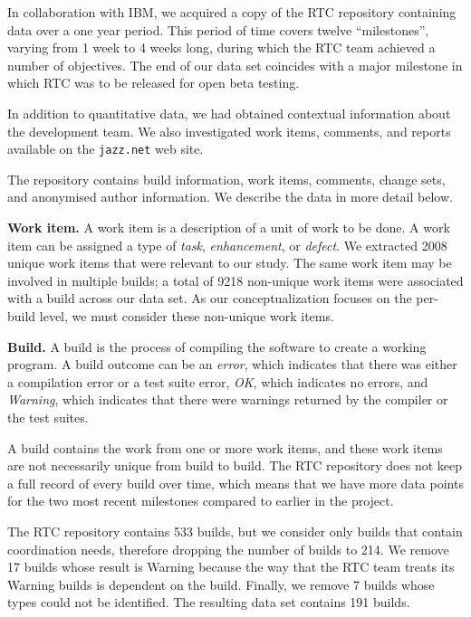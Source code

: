 \documentclass[12pt,oneside]{book}
\begin{document}
In collaboration with IBM, we acquired a copy of the RTC repository containing data over a one year period.
This period of time covers twelve ``milestones'', varying from 1 week to 4 weeks long, during which the RTC team achieved a number of objectives. The end of our data set coincides with a major milestone in which RTC was to be released for open beta testing. 

In addition to quantitative data, we had obtained contextual information about the development team. We also investigated work items, comments, and reports available on the \texttt{jazz.net} web site.

The repository contains build information, work items, comments, change sets, and anonymised author information. We describe the data in more detail below.

\textbf{Work item.} A work item is a description of a unit of work to be done. A work item can be assigned a type of \emph{task}, \emph{enhancement}, or \emph{defect}.
We extracted 2008 unique work items that were relevant to our study.
The same work item may be involved in multiple builds; a total of 9218 non-unique work items were associated with a build across our data set. As our conceptualization focuses on the per-build level, we must consider these non-unique work items.

\textbf{Build.} A build is the process of compiling the software to create a working program.
A build outcome can be an \emph{error}, which indicates that there was either a
compilation error or a test suite error, \emph{OK}, which indicates no
errors, and \emph{Warning}, which indicates that there were warnings
returned by the compiler or the test suites.

A build contains the work from one or more work items, and these work items are not necessarily unique from build to build. The RTC repository does not keep a full record of every build over time, which means that we have more data points for the two most recent milestones compared to earlier in the project.

The RTC repository contains 533 builds, but we consider only builds that contain coordination needs, therefore dropping the number of builds to 214.  We remove 17 builds whose result is Warning because the way that the RTC team treats its Warning builds is dependent on the build. Finally, we remove 7 builds whose types could not be identified. The resulting data set contains 191 builds.
\end{document}
